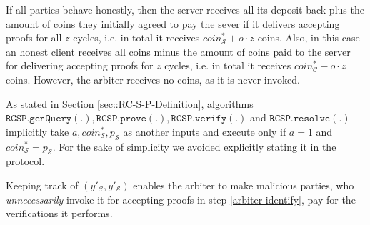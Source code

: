 \begin{enumerate}
\begin{enumerate}
\end{enumerate}
\end{enumerate}



\begin{remark} If all parties behave honestly,   then the server receives all its deposit back plus the amount of coins they initially agreed to pay the sever if it  delivers accepting proofs for all $z$ cycles, i.e. in total it receives $coin^{\scriptscriptstyle *}_{\scriptscriptstyle\mathcal S}+o\cdot z$ coins. Also, in this case an honest client receives all coins minus the amount of coins paid to the server for delivering accepting proofs for $z$ cycles, i.e. in total it receives $coin^{\scriptscriptstyle *}_{\scriptscriptstyle\mathcal C}-o\cdot z$ coins. However, the arbiter receives no coins, as it is never invoked. 
\end{remark}

\begin{remark} As stated in Section \ref{sec::RC-S-P-Definition},   algorithms $\mathtt{RCSP}.\mathtt{genQuery}(.),\mathtt{RCSP}.\mathtt{prove}(.),\mathtt{RCSP}.\mathtt{verify}(.)$ and $\mathtt{RCSP}.\mathtt{resolve}(.)$ implicitly  take $a, coin^{\scriptscriptstyle*}_{\scriptscriptstyle\mathcal{S}}, p_{\scriptscriptstyle\mathcal{S}}$ as another inputs and  execute only if $a=1$ and $coin^{\scriptscriptstyle*}_{\scriptscriptstyle\mathcal{S}}=p_{\scriptscriptstyle\mathcal{S}}$. For the sake of simplicity we  avoided explicitly stating it in the protocol.   
\end{remark}

\begin{remark}
Keeping track of  $(y'_{\scriptscriptstyle\mathcal C},y'_{\scriptscriptstyle\mathcal S})$ enables the arbiter to make malicious parties, who \emph{unnecessarily} invoke  it for  accepting proofs in step \ref{arbiter-identify}, pay  for the verifications it performs. 
\end{remark}








